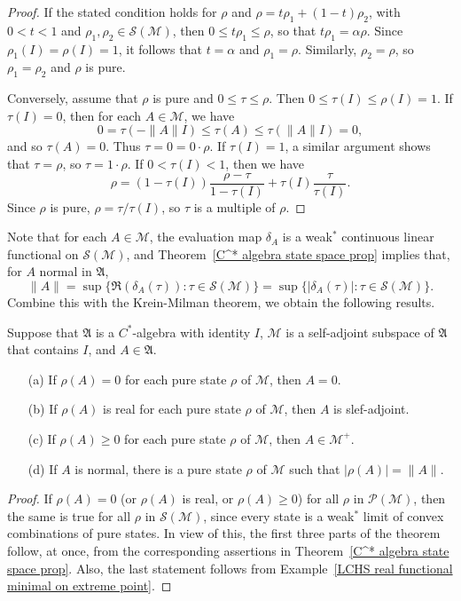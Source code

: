 \begin{proof}
If the stated condition holds for $\rho$ and $\rho=t\rho_1+(1-t)\rho_2$, with $0<t<1$ and $\rho_1,\rho_2\in\mathcal{S}(\mathscr{M})$, then $0\leq t\rho_1\leq\rho$, so that $t\rho_1=\alpha\rho$. Since $\rho_1(I)=\rho(I)=1$, it follows that $t=\alpha$ and $\rho_1=\rho$. Similarly, $\rho_2=\rho$, so $\rho_1=\rho_2$ and $\rho$ is pure.\par
Conversely, assume that $\rho$ is pure and $0\leq\tau\leq\rho$. Then $0\leq\tau(I)\leq\rho(I)=1$. If $\tau(I)=0$, then for each $A\in\mathscr{M}$, we have
\[0=\tau(-\|A\|I)\leq\tau(A)\leq\tau(\|A\|I)=0,\]
and so $\tau(A)=0$. Thus $\tau=0=0\cdot\rho$. If $\tau(I)=1$, a similar argument shows that $\tau=\rho$, so $\tau=1\cdot\rho$. If $0<\tau(I)<1$, then we have
\[\rho=(1-\tau(I))\frac{\rho-\tau}{1-\tau(I)}+\tau(I)\frac{\tau}{\tau(I)}.\]
Since $\rho$ is pure, $\rho=\tau/\tau(I)$, so $\tau$ is a multiple of $\rho$.
\end{proof}
Note that for each $A\in\mathscr{M}$, the evaluation map $\delta_A$ is a weak$^*$ continuous linear functional on $\mathcal{S}(\mathscr{M})$, and Theorem~\ref{C^* algebra state space prop} implies that, for $A$ normal in $\mathfrak{A}$,
\[\|A\|=\sup\{\Re(\delta_A(\tau)):\tau\in\mathcal{S}(\mathscr{M})\}=\sup\{|\delta_A(\tau)|:\tau\in\mathcal{S}(\mathscr{M})\}.\]
Combine this with the Krein-Milman theorem, we obtain the following results.
\begin{theorem}\label{C^* algebra pure state space prop}
Suppose that $\mathfrak{A}$ is a $C^*$-algebra with identity $I$, $\mathscr{M}$ is a self-adjoint subspace of $\mathfrak{A}$ that contains $I$, and $A\in\mathfrak{A}$.
\begin{itemize}
\item[(a)] If $\rho(A)=0$ for each pure state $\rho$ of $\mathscr{M}$, then $A=0$.
\item[(b)] If $\rho(A)$ is real for each pure state $\rho$ of $\mathscr{M}$, then $A$ is slef-adjoint.
\item[(c)] If $\rho(A)\geq 0$ for each pure state $\rho$ of $\mathscr{M}$, then $A\in\mathscr{M}^+$.
\item[(d)] If $A$ is normal, there is a pure state $\rho$ of $\mathscr{M}$ such that $|\rho(A)|=\|A\|$.
\end{itemize}
\end{theorem}
\begin{proof}
If $\rho(A)=0$ (or $\rho(A)$ is real, or $\rho(A)\geq 0$) for all $\rho$ in $\mathcal{P}(\mathscr{M})$, then the same is true for all $\rho$ in $\mathcal{S}(\mathscr{M})$, since every state is a weak$^*$ limit of convex combinations of pure states. In view of this, the first three parts of the theorem follow, at once, from the corresponding assertions in Theorem~\ref{C^* algebra state space prop}. Also, the last statement follows from Example~\ref{LCHS real functional minimal on extreme point}.
\end{proof}
